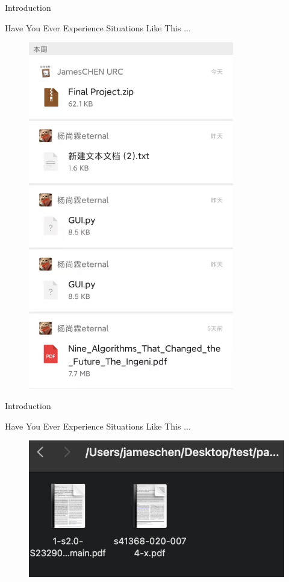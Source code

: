 \documentclass[a4paper,10pt]{beamer}
\begin{document}
\begin{frame}{Introduction}
\begin{block}{Have You Ever Experience Situations Like This ... }
\begin{center}
\begin{minipage}[t]{0.35\textwidth}
\begin{figure}[H]
    \includegraphics[width=0.8\textwidth]{intro.jpeg}
\end{figure}
\end{minipage}
\end{center}
\end{block}
\end{frame}

\begin{frame}{Introduction}
\begin{block}{Have You Ever Experience Situations Like This ... }
\begin{figure}[H]
    \includegraphics[width=\textwidth]{file_rename.png}
\end{figure}
\end{block}
\end{frame}
\end{document}
